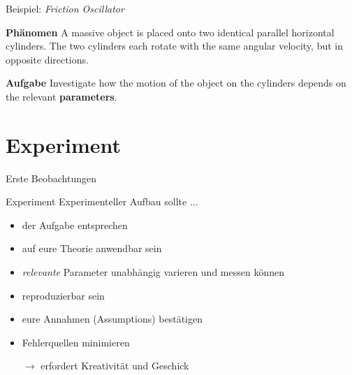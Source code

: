 \documentclass[9pt]{beamer}
\begin{document}
\begin{frame}{Beispiel: \emph{Friction Oscillator}}

\textbf{Phänomen}
{\large A massive \color{brown}object \color{black} is placed onto two identical parallel horizontal cylinders. The two cylinders each rotate with the same angular velocity, but in opposite directions.}
\vfill
\pause
\begin{center}
\end{center}
\vfill
\pause
\textbf{Aufgabe}
{\large Investigate how the \color{blue}motion \color{black} of the object on the cylinders depends on the \color{orange}relevant \textbf{parameters}\color{black}.}
\end{frame}

\section{Experiment}

\begin{frame}{Erste Beobachtungen}
\end{frame}


\begin{frame}{Experiment}
Experimenteller Aufbau sollte ...
\begin{itemize}
\item der Aufgabe entsprechen
\item auf eure Theorie anwendbar sein
\item \emph{relevante} Parameter unabhängig varieren und messen können
\item reproduzierbar sein
\item eure Annahmen (Assumptions) bestätigen
\item Fehlerquellen minimieren
\end{itemize}
\pause
\begin{itemize}
\item[$\rightarrow$] erfordert Kreativität und Geschick
\end{itemize}
\end{frame}
\end{document}
